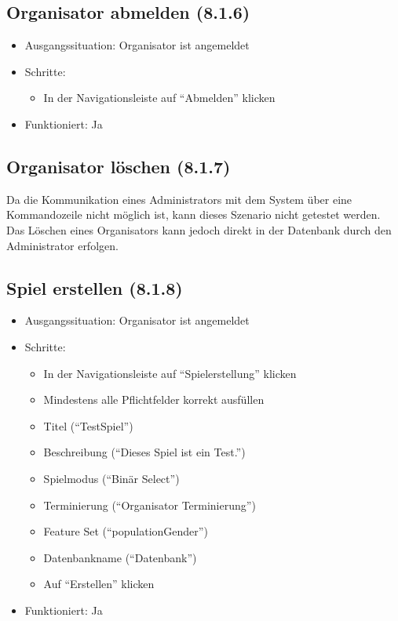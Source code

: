 \documentclass[a4paper]{scrreprt}
\begin{document}
            \subsection{Organisator abmelden (8.1.6)}
            \begin{itemize}
                \item Ausgangssituation: Organisator ist angemeldet
                \item Schritte:
                    \begin{itemize}
                        \item In der Navigationsleiste auf \enquote{Abmelden} klicken
                    \end{itemize}
                \item Funktioniert: Ja
            \end{itemize}

            \subsection{Organisator löschen (8.1.7)}
            Da die Kommunikation eines Administrators mit dem System über eine Kommandozeile nicht möglich ist, kann dieses Szenario nicht getestet werden.
            Das Löschen eines Organisators kann jedoch direkt in der Datenbank durch den Administrator erfolgen.

            \subsection{Spiel erstellen (8.1.8)}
            \begin{itemize}
                \item Ausgangssituation: Organisator ist angemeldet
                \item Schritte:
                    \begin{itemize}
                        \item In der Navigationsleiste auf \enquote{Spielerstellung} klicken
                        \item Mindestens alle Pflichtfelder korrekt ausfüllen
                        \item Titel (\enquote{TestSpiel})
                        \item Beschreibung (\enquote{Dieses Spiel ist ein Test.})
                        \item Spielmodus (\enquote{Binär Select})
                        \item Terminierung (\enquote{Organisator Terminierung})
                        \item Feature Set (\enquote{populationGender})
                        \item Datenbankname (\enquote{Datenbank})
                        \item Auf \enquote{Erstellen} klicken
                    \end{itemize}
                \item Funktioniert: Ja
            \end{itemize}
\end{document}
